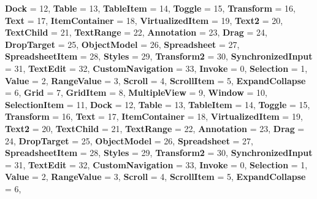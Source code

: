 \begin{DoxyCompactItemize}
{\bfseries Dock} = 12, 
{\bfseries Table} = 13, 
{\bfseries Table\+Item} = 14, 
{\bfseries Toggle} = 15, 
\newline
{\bfseries Transform} = 16, 
{\bfseries Text} = 17, 
{\bfseries Item\+Container} = 18, 
{\bfseries Virtualized\+Item} = 19, 
\newline
{\bfseries Text2} = 20, 
{\bfseries Text\+Child} = 21, 
{\bfseries Text\+Range} = 22, 
{\bfseries Annotation} = 23, 
\newline
{\bfseries Drag} = 24, 
{\bfseries Drop\+Target} = 25, 
{\bfseries Object\+Model} = 26, 
{\bfseries Spreadsheet} = 27, 
\newline
{\bfseries Spreadsheet\+Item} = 28, 
{\bfseries Styles} = 29, 
{\bfseries Transform2} = 30, 
{\bfseries Synchronized\+Input} = 31, 
\newline
{\bfseries Text\+Edit} = 32, 
{\bfseries Custom\+Navigation} = 33, 
{\bfseries Invoke} = 0, 
{\bfseries Selection} = 1, 
\newline
{\bfseries Value} = 2, 
{\bfseries Range\+Value} = 3, 
{\bfseries Scroll} = 4, 
{\bfseries Scroll\+Item} = 5, 
\newline
{\bfseries Expand\+Collapse} = 6, 
{\bfseries Grid} = 7, 
{\bfseries Grid\+Item} = 8, 
{\bfseries Multiple\+View} = 9, 
\newline
{\bfseries Window} = 10, 
{\bfseries Selection\+Item} = 11, 
{\bfseries Dock} = 12, 
{\bfseries Table} = 13, 
\newline
{\bfseries Table\+Item} = 14, 
{\bfseries Toggle} = 15, 
{\bfseries Transform} = 16, 
{\bfseries Text} = 17, 
\newline
{\bfseries Item\+Container} = 18, 
{\bfseries Virtualized\+Item} = 19, 
{\bfseries Text2} = 20, 
{\bfseries Text\+Child} = 21, 
\newline
{\bfseries Text\+Range} = 22, 
{\bfseries Annotation} = 23, 
{\bfseries Drag} = 24, 
{\bfseries Drop\+Target} = 25, 
\newline
{\bfseries Object\+Model} = 26, 
{\bfseries Spreadsheet} = 27, 
{\bfseries Spreadsheet\+Item} = 28, 
{\bfseries Styles} = 29, 
\newline
{\bfseries Transform2} = 30, 
{\bfseries Synchronized\+Input} = 31, 
{\bfseries Text\+Edit} = 32, 
{\bfseries Custom\+Navigation} = 33, 
\newline
{\bfseries Invoke} = 0, 
{\bfseries Selection} = 1, 
{\bfseries Value} = 2, 
{\bfseries Range\+Value} = 3, 
\newline
{\bfseries Scroll} = 4, 
{\bfseries Scroll\+Item} = 5, 
{\bfseries Expand\+Collapse} = 6, 

\end{DoxyCompactItemize}

